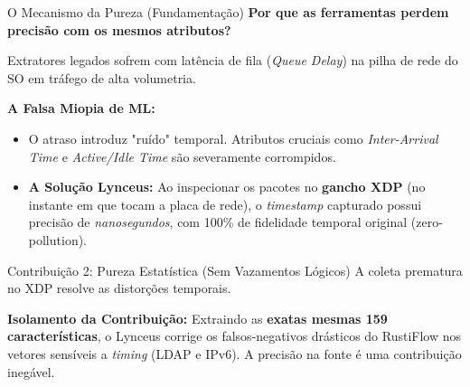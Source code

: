 \documentclass[aspectratio=169,11pt]{beamer}
\begin{document}
\begin{frame}{O Mecanismo da Pureza (Fundamentação)}
    \textbf{Por que as ferramentas perdem precisão com os mesmos atributos?}
    \vspace{0.3cm}
    
    Extratores legados sofrem com latência de fila (\textit{Queue Delay}) na pilha de rede do SO em tráfego de alta volumetria.
    \vspace{0.3cm}
    
    \textbf{A Falsa Miopia de ML:}
    \begin{itemize}
        \item O atraso introduz "ruído" temporal. Atributos cruciais como \textit{Inter-Arrival Time} e \textit{Active/Idle Time} são severamente corrompidos.
        \item \textbf{A Solução Lynceus:} Ao inspecionar os pacotes no \textbf{gancho XDP} (no instante em que tocam a placa de rede), o \textit{timestamp} capturado possui precisão de \textit{nanosegundos}, com 100\% de fidelidade temporal original (zero-pollution).
    \end{itemize}
\end{frame}


\begin{frame}{Contribuição 2: Pureza Estatística (Sem Vazamentos Lógicos)}
    A coleta prematura no XDP resolve as distorções temporais.
    
    \begin{table}[]
        \centering
    \end{table}
    
    \textbf{Isolamento da Contribuição:} Extraindo as \textbf{exatas mesmas 159 características}, o Lynceus corrige os falsos-negativos drásticos do RustiFlow nos vetores sensíveis a \textit{timing} (LDAP e IPv6). A precisão na fonte é uma contribuição inegável.
\end{frame}
\end{document}
